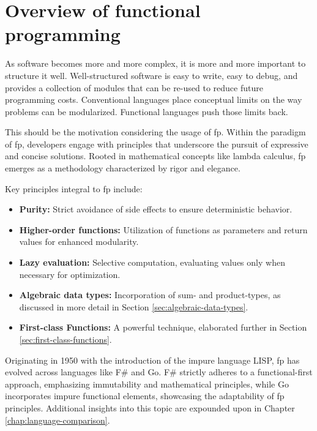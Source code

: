     \chapter{Overview of functional programming}\label{chap:functional-programming}
    \begin{shaded}
        \noindent
        \glqq{}As software becomes more and more complex, it is more and more important to structure it well. Well-structured software is easy to write, easy to debug, and provides a collection of modules that can be re-used to reduce future programming costs. Conventional languages place conceptual limits on the way problems can be modularized. Functional languages push those limits back.\grqq{} \cite{Hughes1989}
    \end{shaded}
    This should be the motivation considering the usage of \ac{fp}.
    Within the paradigm of \ac{fp}, developers engage with principles that underscore the pursuit of expressive and concise solutions. Rooted in mathematical concepts like lambda calculus, \ac{fp} emerges as a methodology characterized by rigor and elegance.
    
    Key principles integral to \ac{fp} include:
    
    \begin{itemize}
        \item \textbf{Purity:} Strict avoidance of side effects to ensure deterministic behavior.
        \item \textbf{Higher-order functions:} Utilization of functions as parameters and return values for enhanced modularity.
        \item \textbf{Lazy evaluation:} Selective computation, evaluating values only when necessary for optimization.
        \item \textbf{Algebraic data types:} Incorporation of sum- and product-types, as discussed in more detail in Section \ref{sec:algebraic-data-types}.
        \item \textbf{First-class Functions:} A powerful technique, elaborated further in Section \ref{sec:first-class-functions}.
    \end{itemize}
    
    Originating in 1950 with the introduction of the impure language LISP, \ac{fp} has evolved across languages like F\# and Go. F\# strictly adheres to a functional-first approach, emphasizing immutability and mathematical principles, while Go incorporates impure functional elements, showcasing the adaptability of \ac{fp} principles. Additional insights into this topic are expounded upon in Chapter \ref{chap:language-comparison}.
    

